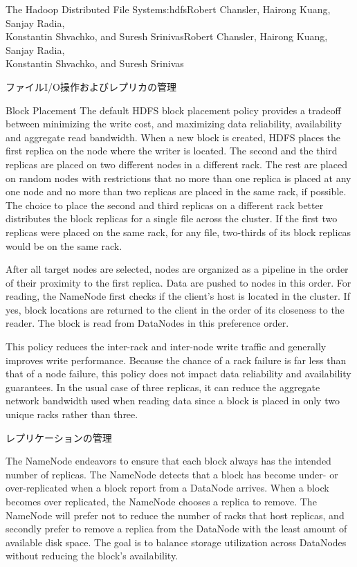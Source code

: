 \begin{aosachaptertoc}{The Hadoop Distributed File System}{s:hdfs}{Robert Chansler, Hairong Kuang, Sanjay Radia, \\ Konstantin Shvachko, and Suresh Srinivas}{Robert Chansler, Hairong Kuang, Sanjay Radia, \\ \hspace*{0.9cm} Konstantin Shvachko, and Suresh Srinivas}
\begin{aosasect1}{ファイルI/O操作およびレプリカの管理}
\begin{aosasect2}{Block Placement}
The default HDFS block placement policy provides a tradeoff between
minimizing the write cost, and maximizing data reliability,
availability and aggregate read bandwidth. When a new block is
created, HDFS places the first replica on the node where the writer is
located. The second and the third replicas are placed on two different
nodes in a different rack. The rest are placed on random nodes with
restrictions that no more than one replica is placed at any one node
and no more than two replicas are placed in the same rack, if
possible. The choice to place the second and third replicas on a
different rack better distributes the block replicas for a single file
across the cluster. If the first two replicas were placed on the same
rack, for any file, two-thirds of its block replicas would be on the
same rack.

After all target nodes are selected, nodes are organized as a pipeline
in the order of their proximity to the first replica. Data are pushed
to nodes in this order. For reading, the NameNode first checks if the
client's host is located in the cluster. If yes, block locations are
returned to the client in the order of its closeness to the
reader. The block is read from DataNodes in this preference order.

This policy reduces the inter-rack and inter-node write traffic and
generally improves write performance. Because the chance of a rack
failure is far less than that of a node failure, this policy does not
impact data reliability and availability guarantees. In the usual case
of three replicas, it can reduce the aggregate network bandwidth used
when reading data since a block is placed in only two unique racks
rather than three.

\end{aosasect2}

\begin{aosasect2}{レプリケーションの管理}

The NameNode endeavors to ensure that each block always has the
intended number of replicas. The NameNode detects that a block has
become under- or over-replicated when a block report from a DataNode
arrives. When a block becomes over replicated, the NameNode chooses a
replica to remove. The NameNode will prefer not to reduce the number
of racks that host replicas, and secondly prefer to remove a replica
from the DataNode with the least amount of available disk space. The
goal is to balance storage utilization across DataNodes without
reducing the block's availability.


\end{aosasect2}
\end{aosasect1}
\end{aosachaptertoc}
